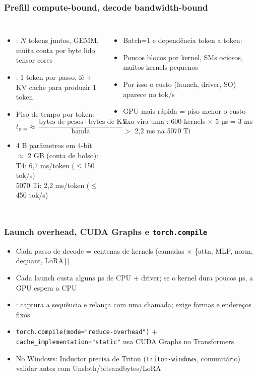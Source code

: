 \documentclass[11pt, aspectratio=169, usepdftitle=false]{beamer}
\begin{document}
\begin{frame}
\frametitle{Prefill compute-bound, decode bandwidth-bound}
\begin{columns}[T]
\begin{itemize}
\item {}: $N$ tokens juntos, GEMM, muita conta por byte lido \so tensor cores
\item {}: 1 token por passo, lê  + KV cache para produzir 1 token
\item Piso de tempo por token:
\[ t_{\text{piso}} \approx \frac{\text{bytes de pesos} + \text{bytes de KV}}{\text{banda}} \]
\item 4 B parâmetros em 4-bit $\approx$ 2 GB (conta de bolso):\\ T4: 6,7 ms/token ($\le$150 tok/s)\\ 5070 Ti: 2,2 ms/token ($\le$450 tok/s)
\end{itemize}
\begin{itemize}
\item Batch=1 e dependência token a token: 
\item Poucos blocos por kernel, SMs ociosos, muitos kernels pequenos
\item Por isso o custo  (launch, driver, SO) aparece no tok/s
\item GPU mais rápida = piso menor \so o custo fixo vira uma : 600 kernels $\times$ 5 µs = 3 ms $>$ 2,2 ms na 5070 Ti
\end{itemize}
\end{columns}
\end{frame}

\begin{frame}
\frametitle{Launch overhead, CUDA Graphs e \texttt{torch.compile}}
\begin{itemize}
\item Cada passo de decode = centenas de kernels (camadas $\times$ \{attn, MLP, norm, dequant, LoRA\})
\item Cada launch custa alguns µs de CPU + driver; se o kernel dura poucos µs, a GPU espera a CPU
\item {}: captura a sequência e relança com uma chamada; exige formas e endereços fixos
\item \texttt{torch.compile(mode="reduce-overhead")} + \texttt{cache\_implementation="static"} usa CUDA Graphs no Transformers
\item No Windows: Inductor precisa de Triton (\texttt{triton-windows}, comunitário) \so validar antes com Unsloth/bitsandbytes/LoRA
\end{itemize}
\end{frame}
\end{document}
